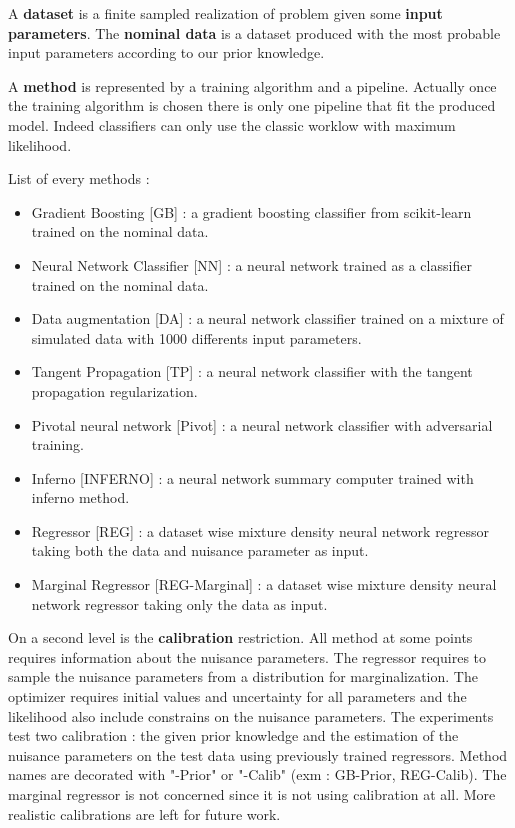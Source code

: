 A \textbf{dataset} is a finite sampled realization of problem given some \textbf{input parameters}.
The \textbf{nominal data} is a dataset produced with the most probable input parameters according to our prior knowledge.


A \textbf{method} is represented by a training algorithm and a pipeline.
Actually once the training algorithm is chosen there is only one pipeline that fit the produced model.
Indeed classifiers can only use the classic worklow with maximum likelihood.

List of every methods :
\begin{itemize}
	\item Gradient Boosting [GB] : a gradient boosting classifier from scikit-learn trained on the nominal data.
	\item Neural Network Classifier [NN] : a neural network trained as a classifier trained on the nominal data.
	\item Data augmentation [DA] : a neural network classifier trained on a mixture of simulated data with 1000 differents input parameters.
	\item Tangent Propagation [TP] : a neural network classifier with the tangent propagation regularization.
	\item Pivotal neural network [Pivot] : a neural network classifier with adversarial training.
	\item Inferno [INFERNO] : a neural network summary computer trained with inferno method.
	\item Regressor [REG] : a dataset wise mixture density neural network regressor taking both the data and nuisance parameter as input.
	\item Marginal Regressor [REG-Marginal] : a dataset wise mixture density neural network regressor taking only the data as input.
\end{itemize}

On a second level is the \textbf{calibration} restriction.
All method at some points requires information about the nuisance parameters.
The regressor requires to sample the nuisance parameters from a distribution for marginalization.
The optimizer requires initial values and uncertainty for all parameters and the likelihood also include constrains on the nuisance parameters.
The experiments test two calibration : the given prior knowledge and the estimation of the nuisance parameters on the test data using previously trained regressors.
Method names are decorated with "-Prior" or "-Calib" (exm : GB-Prior, REG-Calib). The marginal regressor is not concerned since it is not using calibration at all.
More realistic calibrations are left for future work.

